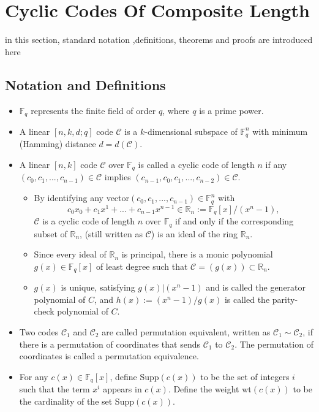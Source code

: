 \documentclass[fontsize=12pt]{article}
\begin{document}
\section{Cyclic Codes Of Composite Length}
in this section, standard notation ,definitions, theorems and proofs are introduced here

\subsection{Notation and Definitions}
\begin{itemize}
\item $\mathbb{F}_q$ represents the finite field of order $q$, where $q$ is a prime
power. 
\item A linear $[n, k, d; q]$ code $\mathcal{C}$ is a $k$-dimensional subspace
of $\mathbb{F}_q^n$
with minimum (Hamming) distance $d = d(\mathcal{C})$.
\item A linear
$[n, k]$ code $\mathcal{C}$ over $\mathbb{F}_q$ is called a cyclic code of length $n$ if any
$(c_0, c_1, ... , c_{n-1}) \in \mathcal{C}$ implies $(c_{n-1}, c_0, c_1, . . . , c_{n-2}) \in \mathcal{C}$.
\begin{itemize}
\item By identifying any vector$ (c_0, c_1, . . . , c_{n-1}) \in \mathbb{F}_q^n$
with $$c_0x_0+ c_1x^1+ ... + c_{n-1}x^{n-1}\in \mathbb{R}_n := \mathbb{F}_q[x]/(x^n-1),$$
 $\mathcal{C}$ is a cyclic code of length $n$ over $\mathbb{F}_q$ if and
only if the corresponding subset of $\mathbb{R}_n$, (still written as $\mathcal{C}$) is an
ideal of the ring $\mathbb{R}_n$. 
\item Since every ideal of $\mathbb{R}_n$ is principal,
there is a monic polynomial $g(x) \in \mathbb{F}_q [x]$ of least degree
such that $\mathcal{C} = (g(x)) \subset \mathbb{R}_n$. 
\item $g(x)$ is unique, satisfying
$g(x)|(x^{n}−1)$ and is called the generator polynomial of $C$, and
$h(x) := (x^{n} − 1)/g(x)$ is called the parity-check polynomial
of $C$.
\end{itemize}
\item Two codes $\mathcal{C}_1$ and $\mathcal{C}_2$ are called permutation equivalent,
written as $\mathcal{C}_1 \sim \mathcal{C}_2$, if there is a permutation of coordinates
that sends $\mathcal{C}_1$ to $\mathcal{C}_2$. The permutation of coordinates is called
a permutation equivalence.
\item For any $c(x) \in \mathbb{F}_q [x]$, define Supp$(c(x))$ to be
the set of integers $i$ such that the term $x^i$ appears
in $c(x)$. Define the weight wt$(c(x))$ to be the cardinality
of the set Supp$(c(x))$. 
\end{itemize}
\end{document}
